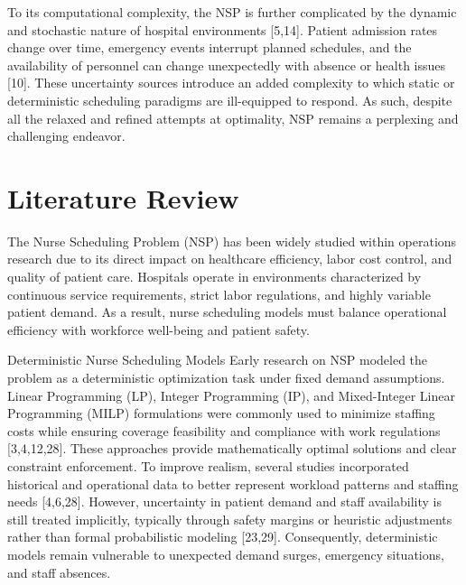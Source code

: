 \documentclass[10pt,a4paper,twocolumn]{article}
\begin{document}
To its computational complexity, the NSP is further complicated by the dynamic and stochastic
nature of hospital environments [5,14]. Patient admission rates change over time, emergency
events interrupt planned schedules, and the availability of personnel can change unexpectedly
with absence or health issues [10]. These uncertainty sources introduce an added complexity to
which static or deterministic scheduling paradigms are ill-equipped to respond. As such, despite
all the relaxed and refined attempts at optimality, NSP remains a perplexing and challenging
endeavor.

\section{Literature Review}
The Nurse Scheduling Problem (NSP) has been widely studied within operations research due to its direct impact on healthcare efficiency, labor cost control, and quality of patient care. Hospitals operate in environments characterized by continuous service requirements, strict labor regulations, and highly variable patient demand. As a result, nurse scheduling models must balance operational efficiency with workforce well-being and patient safety.

Deterministic Nurse Scheduling Models
Early research on NSP modeled the problem as a deterministic optimization task under fixed demand assumptions. Linear Programming (LP), Integer Programming (IP), and Mixed-Integer Linear Programming (MILP) formulations were commonly used to minimize staffing costs while ensuring coverage feasibility and compliance with work regulations [3,4,12,28]. These approaches provide mathematically optimal solutions and clear constraint enforcement.
To improve realism, several studies incorporated historical and operational data to better represent workload patterns and staffing needs [4,6,28]. However, uncertainty in patient demand and staff availability is still treated implicitly, typically through safety margins or heuristic adjustments rather than formal probabilistic modeling [23,29]. Consequently, deterministic models remain vulnerable to unexpected demand surges, emergency situations, and staff absences.
\end{document}
